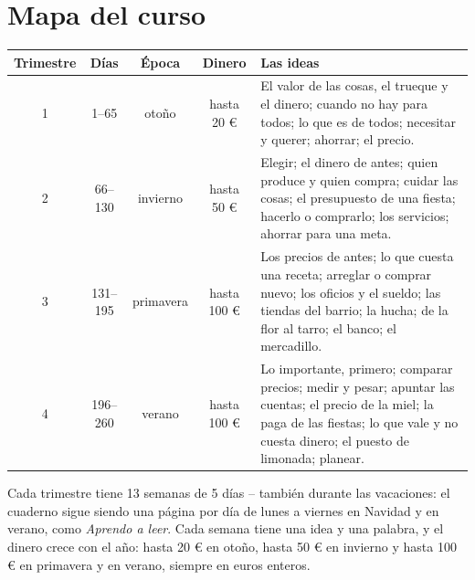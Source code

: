 \section*{Mapa del curso}

\begin{center}
\renewcommand{\arraystretch}{1.4}
\begin{tabularx}{\linewidth}{@{}c c c c X@{}}
\toprule
\textbf{Trimestre} & \textbf{Días} & \textbf{Época} & \textbf{Dinero} & \textbf{Las ideas} \\
\midrule
1 & 1--65 & otoño & hasta 20 € & El valor de las cosas, el trueque y el
dinero; cuando no hay para todos; lo que es de todos; necesitar y
querer; ahorrar; el precio. \\
2 & 66--130 & invierno & hasta 50 € & Elegir; el dinero de antes; quien
produce y quien compra; cuidar las cosas; el presupuesto de una fiesta;
hacerlo o comprarlo; los servicios; ahorrar para una meta. \\
3 & 131--195 & primavera & hasta 100 € & Los precios de antes; lo que
cuesta una receta; arreglar o comprar nuevo; los oficios y el sueldo;
las tiendas del barrio; la hucha; de la flor al tarro; el banco; el
mercadillo. \\
4 & 196--260 & verano & hasta 100 € & Lo importante, primero; comparar
precios; medir y pesar; apuntar las cuentas; el precio de la miel; la
paga de las fiestas; lo que vale y no cuesta dinero; el puesto de
limonada; planear. \\
\bottomrule
\end{tabularx}
\end{center}

\vspace{6mm}
Cada trimestre tiene 13 semanas de 5 días -- también durante las
vacaciones: el cuaderno sigue siendo una página por día de lunes a
viernes en Navidad y en verano, como \emph{Aprendo a leer}. Cada semana
tiene una idea y una palabra, y el dinero crece con el año: hasta 20 €
en otoño, hasta 50 € en invierno y hasta 100 € en primavera y en verano,
siempre en euros enteros.
\newpage
